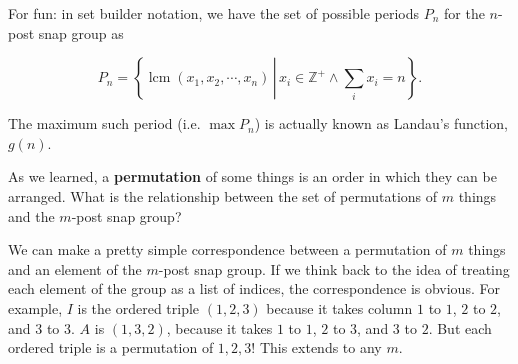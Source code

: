 \documentclass[../gatm_answers.tex]{subfiles}
\begin{document}
For fun: in set builder notation, we have the set of possible periods $P_n$ for the $n$-post snap group as

$$P_n=\left\{\operatorname{lcm} (x_1, x_2, \cdots, x_n)\, \left|\,x_i\in\mathbb{Z}^+ \land \sum_i x_i=n\right.\right\}.$$

\noindent The maximum such period (i.e. $\max P_n$) is actually known as Landau's function, $g(n)$.

\begin{outer_problem}
	\item As we learned, a \textbf{permutation} of some things is an order in which they can be arranged. What is the relationship between the set of permutations of $m$ things and the $m$-post snap group?
\end{outer_problem}

\noindent We can make a pretty simple correspondence between a permutation of $m$ things and an element of the $m$-post snap group. If we think back to the idea of treating each element of the group as a list of indices, the correspondence is obvious. For example, $I$ is the ordered triple $(1,2,3)$ because it takes column $1$ to $1$, $2$ to $2$, and $3$ to $3$. $A$ is $(1,3,2)$, because it takes $1$ to $1$, $2$ to $3$, and $3$ to $2$. But each ordered triple is a permutation of ${1,2,3}$! This extends to any $m$.
\end{document}
